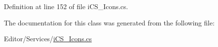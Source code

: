 Definition at line 152 of file i\+C\+S\+\_\+\+Icons.\+cs.



The documentation for this class was generated from the following file\+:\begin{DoxyCompactItemize}
\item 
Editor/\+Services/\hyperlink{i_c_s___icons_8cs}{i\+C\+S\+\_\+\+Icons.\+cs}\end{DoxyCompactItemize}
